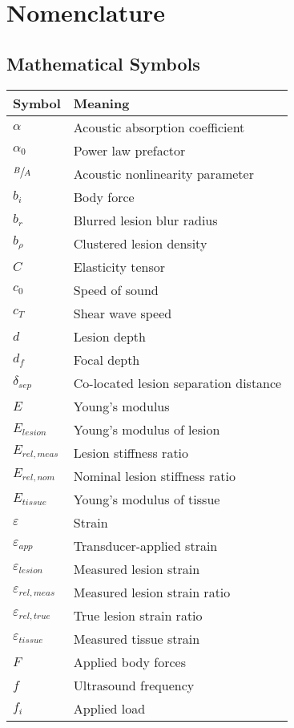 \chapter*{Nomenclature}
	\section*{Mathematical Symbols}
		\begin{longtable}[l]{ll}
			Symbol & Meaning \\
			\hline \endhead
			$\alpha$ & Acoustic absorption coefficient \\
			$\alpha_0$ & Power law prefactor \\
			$\sfrac{B}{A}$ & Acoustic nonlinearity parameter \\
			$b_i$ & Body force \\
			$b_r$ & Blurred lesion blur radius \\
			$b_\rho$ & Clustered lesion density \\
			$C$ & Elasticity tensor \\
			$c_0$ & Speed of sound \\
			$c_T$ & Shear wave speed \\
			$d$ & Lesion depth \\
			$d_f$ & Focal depth \\
			$\delta_{sep}$ & Co-located lesion separation distance \\
			$E$ & Young's modulus \\
			$E_{lesion}$ & Young's modulus of lesion \\
			$E_{rel,meas}$ & Lesion stiffness ratio \\
			$E_{rel,nom}$ & Nominal lesion stiffness ratio \\
			$E_{tissue}$ & Young's modulus of tissue \\
			$\varepsilon$ & Strain \\
			$\varepsilon_{app}$ & Transducer-applied strain \\
			$\varepsilon_{lesion}$ & Measured lesion strain \\
			$\varepsilon_{rel,meas}$ & Measured lesion strain ratio \\
			$\varepsilon_{rel,true}$ & True lesion strain ratio \\
			$\varepsilon_{tissue}$ & Measured tissue strain \\
			$F$ & Applied body forces \\
			$f$ & Ultrasound frequency \\
			$f_i$ & Applied load \\

\end{longtable}
